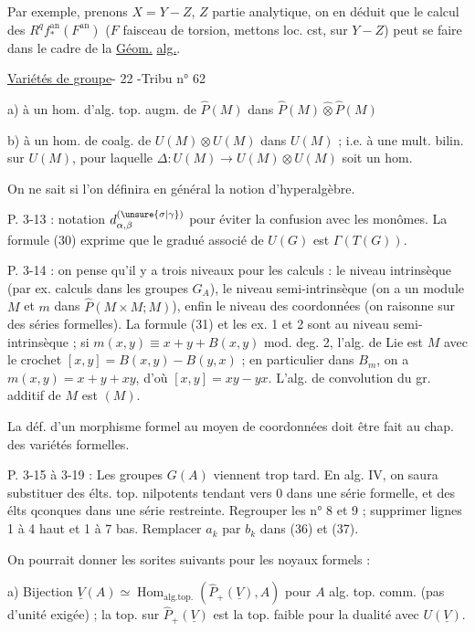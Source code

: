 Par exemple, prenons $X=Y-Z$, $Z$ partie analytique, on en déduit que le calcul des $R^q f_*^{\mathrm{an}}(F^{\mathrm{an}})$ ($F$ faisceau de torsion, mettons loc. cst, sur $Y-Z$)  peut se faire dans le cadre de la \uline{Géom.} \uline{alg.}.

\uline{Variétés de groupe}\hfill - 22 -\hfill Tribu n° 62

a) à un hom. d'alg. top. augm. de $\hat P(M)$ dans $\hat P(M)\mathbin{\widehat\otimes}\hat P(M)$

b) à un hom. de coalg. de $U(M)\otimes U(M)$ dans $U(M)$ ; i.e. à une mult. bilin. sur $U(M)$, pour laquelle $\Delta:U(M)\longrightarrow U(M)\otimes U(M)$ soit un hom.

On ne sait si l'on définira en général la notion d'hyperalgèbre.

P. 3-13 : notation $d^{(\unsure{\sigma|\gamma})}_{\alpha,\beta}$ pour éviter la confusion avec les monômes. La formule (30) exprime que le gradué associé de $U(G)$ est $\Gamma(T(G))$.

P. 3-14 : on pense qu'il y a trois niveaux pour les calculs : le niveau intrinsèque (par ex. calculs dans les groupes $G_A$), le niveau semi-intrinsèque (on a un module $M$ et $m$ dans $\hat P(M\times M;M)$), enfin le niveau des coordonnées (on raisonne sur des séries formelles). La formule (31) et les ex. 1 et 2 sont au niveau semi-intrinsèque ; si $m(x,y)\equiv x+y+B(x,y)$ mod. deg. 2, l'alg. de Lie est $M$ avec le crochet $[x,y]=B(x,y)-B(y,x)$ ; en particulier dans $B_m$, on a $m(x,y)=x+y+xy$, d'où $[x,y]=xy-yx$. L'alg. de convolution du gr. additif de $M$ est $(M)$.

La déf. d'un morphisme formel au moyen de coordonnées doit être fait au chap. des variétés formelles.

P. 3-15 à 3-19 : Les groupes $G(A)$ viennent trop tard. En alg. IV, on saura substituer des élts. top. nilpotents tendant vers 0 dans une série formelle, et des élts qconques dans une série restreinte. Regrouper les n° 8 et 9 ; supprimer lignes 1 à 4 haut et 1 à 7 bas. Remplacer $a_k$ par $b_k$ dans (36) et (37).

On pourrait donner les sorites suivants pour les noyaux formels :

a) Bijection $\underline V(A)\simeq\operatorname{Hom}_{\mathrm{alg.top.}}(\hat P_+(\underline V),A)$ pour $A$ alg. top. comm. (pas d'unité exigée) ; la top. sur $\hat P_+(\underline V)$ est la top. faible pour la dualité avec $U(\underline V)$.


